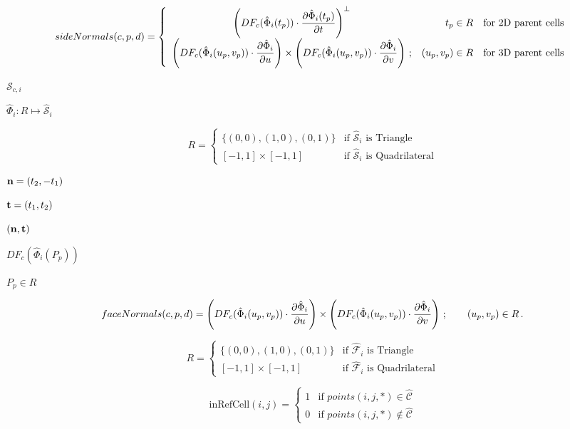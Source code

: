 \documentclass{article}
\begin{document}
\[
        {sideNormals}(c,p,d) = 
          \left\{\begin{array}{crl} 
            \displaystyle
            \left(DF_c(\hat{\Phi}_i(t_p))\cdot 
            {\partial{\hat{\Phi}}_{i}(t_p)\over\partial t}\right)^{\perp} &  t_p\in R 
                                                        & \mbox{for 2D parent cells} \\[2ex]
            \displaystyle
            \left( DF_c(\hat{\Phi}_i(u_p, v_p))\cdot {\partial\hat{\Phi}_i\over\partial u}\right) \times
            \left( DF_c(\hat{\Phi}_i(u_p, v_p))\cdot {\partial\hat{\Phi}_i\over\partial v}\right) \,;
            & (u_p, v_p) \in R                          & \mbox{for 3D parent cells}
        \end{array}\right.
 \]
\pagebreak

${\mathcal S}_{c,i}$
\pagebreak

$ \hat{\Phi}_i : R\mapsto \hat{\mathcal S}_i$
\pagebreak

\[
        R = \left\{\begin{array}{rl} 
            \{(0,0),(1,0),(0,1)\} & \mbox{if $\hat{\mathcal S}_i$ is Triangle} \\[1ex]
            [-1,1]\times [-1,1] & \mbox{if $\hat{\mathcal S}_i$ is Quadrilateral}
            \end{array}\right.
\]
\pagebreak

${\bf n}=(t_2,-t_1)$
\pagebreak

${\bf t}=(t_1,t_2)$
\pagebreak

$({\bf n},{\bf t})$
\pagebreak

$DF_c(\hat{\Phi}_i(P_p))$
\pagebreak

$P_p\in R$
\pagebreak

\[
        {faceNormals}(c,p,d) = 
           \left( DF_c(\hat{\Phi}_i(u_p, v_p))\cdot {\partial\hat{\Phi}_i\over\partial u}\right) \times
           \left( DF_c(\hat{\Phi}_i(u_p, v_p))\cdot {\partial\hat{\Phi}_i\over\partial v}\right) \,;
           \qquad (u_p, v_p) \in R \,.
\]
\pagebreak

\[
        R = \left\{\begin{array}{rl} 
            \{(0,0),(1,0),(0,1)\} & \mbox{if $\hat{\mathcal F}_i$ is Triangle} \\[1ex]
              [-1,1]\times [-1,1] & \mbox{if $\hat{\mathcal F}_i$ is Quadrilateral}
            \end{array}\right.
\]
\pagebreak

\[
       \mbox{inRefCell}(i,j) = 
         \left\{\begin{array}{rl} 
            1 & \mbox{if $points(i,j,*)\in\hat{\mathcal{C}}$} \\[2ex]
            0 & \mbox{if $points(i,j,*)\notin\hat{\mathcal{C}}$} 
         \end{array}\right.
  \]
\pagebreak
\end{document}
